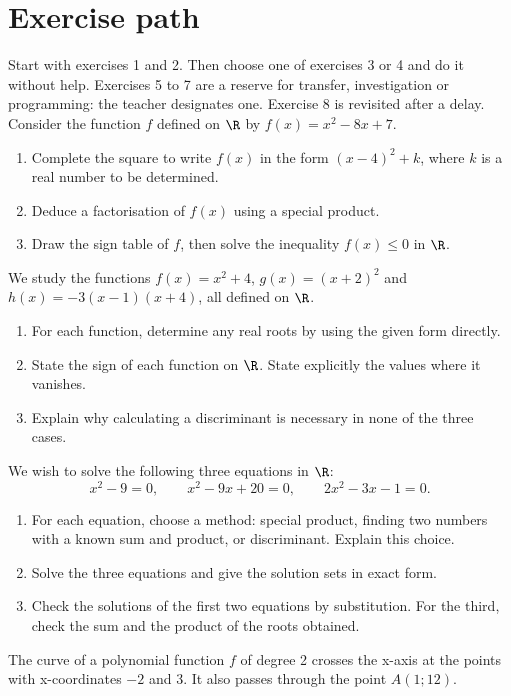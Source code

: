 \section*{Exercise path}\label{C02-PARC}
Start with exercises 1 and 2. Then choose one of exercises 3 or 4 and do it without help. Exercises 5 to 7 are a reserve for transfer, investigation or programming: the teacher designates one. Exercise 8 is revisited after a delay.
\begingroup
{}
Consider the function $f$ defined on $\R$ by $f(x)=x^2-8x+7$.
\begin{enumerate}[label=\arabic*.]
\item Complete the square to write $f(x)$ in the form $(x-4)^2+k$, where $k$ is a real number to be determined.
\item Deduce a factorisation of $f(x)$ using a special product.
\item Draw the sign table of $f$, then solve the inequality $f(x)\leq0$ in $\R$.
\end{enumerate}
We study the functions $f(x)=x^2+4$, $g(x)=(x+2)^2$ and $h(x)=-3(x-1)(x+4)$, all defined on $\R$.
\begin{enumerate}[label=\arabic*.]
\item For each function, determine any real roots by using the given form directly.
\item State the sign of each function on $\R$. State explicitly the values where it vanishes.
\item Explain why calculating a discriminant is necessary in none of the three cases.
\end{enumerate}
We wish to solve the following three equations in $\R$:\[x^2-9=0,\qquad x^2-9x+20=0,\qquad 2x^2-3x-1=0.\]
\begin{enumerate}[label=\arabic*.]
\item For each equation, choose a method: special product, finding two numbers with a known sum and product, or discriminant. Explain this choice.
\item Solve the three equations and give the solution sets in exact form.
\item Check the solutions of the first two equations by substitution. For the third, check the sum and the product of the roots obtained.
\end{enumerate}
The curve of a polynomial function $f$ of degree 2 crosses the x-axis at the points with x-coordinates $-2$ and 3. It also passes through the point $A(1;12)$.
